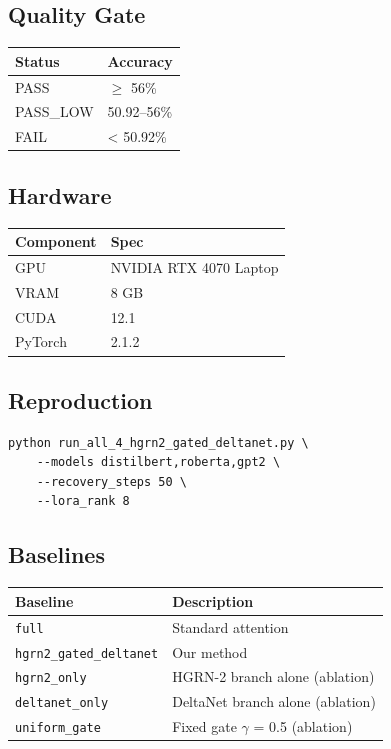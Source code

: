 \subsection{Quality Gate}

\begin{table}[H]
\centering
\small
\begin{tabular}{ll}
\toprule
\textbf{Status} & \textbf{Accuracy} \\
\midrule
PASS & $\ge$ 56\% \\
PASS\_LOW & 50.92--56\% \\
FAIL & < 50.92\% \\
\bottomrule
\end{tabular}
\end{table}

\subsection{Hardware}

\begin{table}[H]
\centering
\small
\begin{tabular}{ll}
\toprule
\textbf{Component} & \textbf{Spec} \\
\midrule
GPU & NVIDIA RTX 4070 Laptop \\
VRAM & 8 GB \\
CUDA & 12.1 \\
PyTorch & 2.1.2 \\
\bottomrule
\end{tabular}
\end{table}

\subsection{Reproduction}

\begin{lstlisting}
python run_all_4_hgrn2_gated_deltanet.py \
    --models distilbert,roberta,gpt2 \
    --recovery_steps 50 \
    --lora_rank 8
\end{lstlisting}

\subsection{Baselines}

\begin{table}[H]
\centering
\small
\begin{tabular}{ll}
\toprule
\textbf{Baseline} & \textbf{Description} \\
\midrule
\texttt{full} & Standard attention \\
\texttt{hgrn2\_gated\_deltanet} & Our method \\
\texttt{hgrn2\_only} & HGRN-2 branch alone (ablation) \\
\texttt{deltanet\_only} & DeltaNet branch alone (ablation) \\
\texttt{uniform\_gate} & Fixed gate $\gamma$ = 0.5 (ablation) \\
\bottomrule
\end{tabular}
\end{table}

